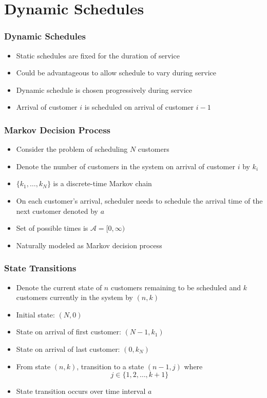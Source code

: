 \documentclass{beamer}
\begin{document}
\section{Dynamic Schedules}

\begin{frame}
	\frametitle{Dynamic Schedules}

	\begin{itemize}
		\item Static schedules are fixed for the duration of service
		\item Could be advantageous to allow schedule to vary during service
		\item Dynamic schedule is chosen progressively during service
		\item Arrival of customer $i$ is scheduled on arrival of customer $i - 1$
	\end{itemize}
\end{frame}

\begin{frame}
	\frametitle{Markov Decision Process}

	\begin{itemize}
		\item Consider the problem of scheduling $N$ customers
		\item Denote the number of customers in the system on arrival of customer $i$ by $k_{i}$
		\item $\{ k_{1}, \ldots, k_{N} \}$ is a discrete-time Markov chain
		\item On each customer's arrival, scheduler needs to schedule the arrival time of the next customer denoted by $a$
		\item Set of possible times is $\mathcal{A} = [0, \infty)$
		\item Naturally modeled as \alert{Markov decision process}
	\end{itemize}
\end{frame}

\begin{frame}
	\frametitle{State Transitions}

	\begin{itemize}
		\item Denote the current state of $n$ customers remaining to be scheduled and $k$ customers currently in the system by $(n, k)$
		\item Initial state: $(N, 0)$
		\item State on arrival of first customer: $(N - 1, k_{1})$
		\item State on arrival of last customer: $(0, k_{N})$
		\item From state $(n, k)$, transition to a state $(n - 1, j)$ where
		\begin{equation*}
			j \in \Big\{ 1, 2, \ldots, k + 1 \Big\}
		\end{equation*}
		\item State transition occurs over time interval $a$
	\end{itemize}
\end{frame}
\end{document}
